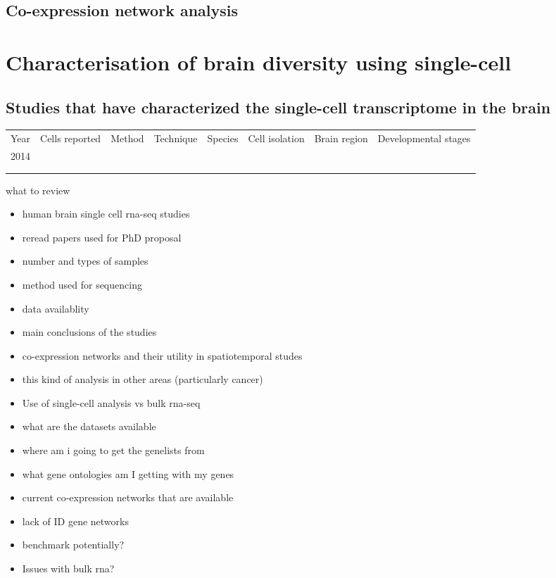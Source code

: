 \documentclass[12pt]{article}
\begin{document}
\subsection{Co-expression network analysis}

\section{Characterisation of brain diversity using single-cell}
\subsection{Studies that have characterized the single-cell transcriptome in the brain}

\begin{table}[]
	\begin{tabular}{llllllll}
		Year & Cells reported  & Method  & Technique  & Species  &  Cell isolation & Brain region & Developmental stages\\
		2014 &  &  &  & & & & \\
		&  &  &  & &&& \\
		&  &  &  & &&&
	\end{tabular}
\end{table}


what to review

\begin{itemize}
	\item human brain single cell rna-seq studies 
	\item reread papers used for PhD proposal 
	\item number and types of samples 
	\item method used for sequencing 
	\item data availablity 
	\item main conclusions of the studies
	\item co-expression networks and their utility in spatiotemporal studes 
	\item this kind of analysis in other areas (particularly cancer)
	\item Use of single-cell analysis vs bulk rna-seq 
\end{itemize}


\begin{itemize}
	
	\item what are the datasets available 
	\item where am i going to get the genelists from 
	\item what gene ontologies am I getting with my genes 
	\item current co-expression networks that are available
	\item lack of ID gene networks 
	\item benchmark potentially?
	\item Issues with bulk rna? 
	
\end{itemize}
\end{document}
